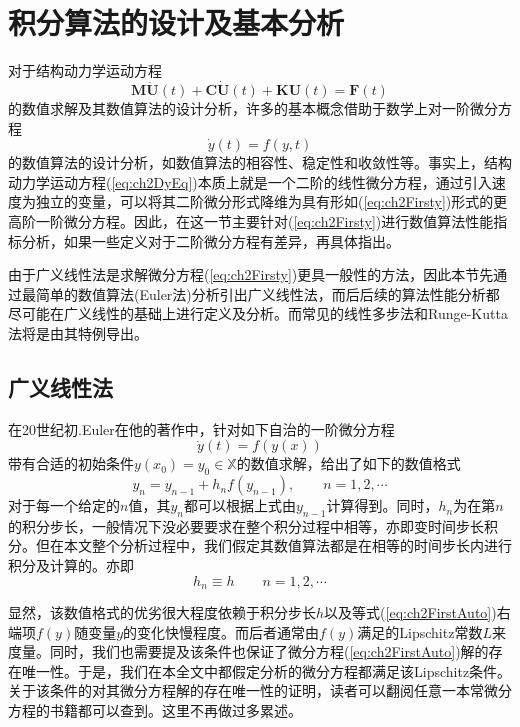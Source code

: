 \chapter{积分算法的设计及基本分析}
对于结构动力学运动方程
\begin{equation}
\bm{M}\ddot{\bm{U}}(t)+\bm{C}\dot{\bm{U}}(t)+\bm{KU}(t)=\bm{F}(t)\label{eq:ch2DyEq}
\end{equation}
的数值求解及其数值算法的设计分析，许多的基本概念借助于数学上对一阶微分方程
\begin{equation}
\dot{y}(t)=f(y,t)\label{eq:ch2Firsty}
\end{equation}
的数值算法的设计分析，如数值算法的相容性、稳定性和收敛性等。事实上，结构动力学运动方程(\ref{eq:ch2DyEq})本质上就是一个二阶的线性微分方程，通过引入速度为独立的变量，可以将其二阶微分形式降维为具有形如(\ref{eq:ch2Firsty})形式的更高阶一阶微分方程。因此，在这一节主要针对(\ref{eq:ch2Firsty})进行数值算法性能指标分析，如果一些定义对于二阶微分方程有差异，再具体指出。

由于广义线性法是求解微分方程(\ref{eq:ch2Firsty})更具一般性的方法，因此本节先通过最简单的数值算法(Euler法)分析引出广义线性法，而后后续的算法性能分析都尽可能在广义线性的基础上进行定义及分析。而常见的线性多步法和Runge-Kutta法将是由其特例导出。

\section{广义线性法}
在20世纪初.Euler在他的著作中，针对如下自治的一阶微分方程
\begin{equation}
\dot{y}(t)=f(y(x))\label{eq:ch2FirstAuto}
\end{equation}
带有合适的初始条件$y(x_0)=y_0\in\mathbb{X}$的数值求解，给出了如下的数值格式
\begin{equation}
y_n=y_{n-1}+h_nf(y_{n-1}),\qquad n=1,2,\cdots\label{eq:ch2Euler}
\end{equation}
对于每一个给定的$n$值，其$y_n$都可以根据上式由$y_{n-1}$计算得到。同时，$h_n$为在第$n$的积分步长，一般情况下没必要要求在整个积分过程中相等，亦即变时间步长积分。但在本文整个分析过程中，我们假定其数值算法都是在相等的时间步长内进行积分及计算的。亦即
\begin{equation}
h_n\equiv h\qquad n=1,2,\cdots
\end{equation}

显然，该数值格式的优劣很大程度依赖于积分步长$h$以及等式(\ref{eq:ch2FirstAuto})右端项$f(y)$随变量$y$的变化快慢程度。而后者通常由$f(y)$满足的Lipschitz常数$L$来度量。同时，我们也需要提及该条件也保证了微分方程(\ref{eq:ch2FirstAuto})解的存在唯一性。于是，我们在本全文中都假定分析的微分方程都满足该Lipschitz条件。关于该条件的对其微分方程解的存在唯一性的证明，读者可以翻阅任意一本常微分方程的书籍都可以查到。这里不再做过多累述。

